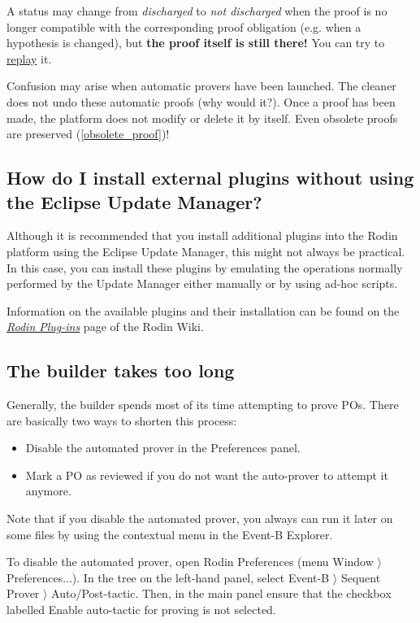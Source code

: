 A status may change from \emph{discharged} to \emph{not discharged} when the proof is no longer compatible with the corresponding proof obligation (e.g. when a hypothesis is changed), but \textbf{the proof itself is still there!}
You can try to \href{https://wiki.event-b.org/index.php/Proof_Obligation_Commands#Proof_Replay_on_Undischarged_POs}{replay} it.

Confusion may arise when automatic provers have been launched. The cleaner does not undo these automatic proofs (why would it?). Once a proof has been made, the platform does not modify or delete it by itself. Even obsolete proofs are preserved (\ref{obsolete_proof})!

\subsection{How do I install external plugins without using the Eclipse Update Manager?}

Although it is recommended that you install additional plugins into the Rodin platform using the Eclipse Update Manager, this might not always be practical. In this case, you can install these plugins by emulating the operations normally performed by the Update Manager either manually or by using ad-hoc scripts. 

Information on the available plugins and their installation can be found on the \href{https://wiki.event-b.org/index.php/Rodin_Plug-ins}{\emph{Rodin Plug-ins}} page of the Rodin Wiki. 

\subsection{The builder takes too long}

Generally, the builder spends most of its time attempting to prove POs. There are basically two ways to shorten this process: 

\begin{itemize}
	\item Disable the automated prover in the \textsf{Preferences} panel. 
	\item Mark a PO as reviewed if you do not want the auto-prover to attempt it anymore. 
\end{itemize}

Note that if you disable the automated prover, you always can run it later on some files by using the contextual menu in the Event-B Explorer. 

To disable the automated prover, open \textsf{Rodin Preferences} 
(menu \textsf{Window $\rangle$ Preferences...}). In the tree on the left-hand panel, select \textsf{Event-B $\rangle$ Sequent Prover $\rangle$ Auto/Post-tactic}. Then, in the main panel ensure that the checkbox labelled \textsf{Enable auto-tactic for proving} is not selected. 

